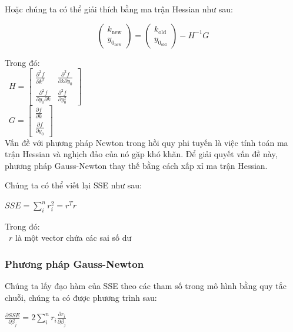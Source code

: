 \documentclass[conference]{IEEEtran}
\begin{document}
Hoặc chúng ta có thể giải thích bằng ma trận Hessian như sau:

\begin{center}
    \[
        \begin{pmatrix}
            k_{\text{new}} \\ y_{0_\text{new}}
        \end{pmatrix} =
        \begin{pmatrix}
            k_{\text{old}} \\ y_{0_\text{old}}
        \end{pmatrix} - H^{-1}G
    \]
\end{center}

Trong đó: \\
\indent\textbullet\ \(H = \begin{bmatrix}
    \frac{\partial^2 f}{\partial k^2}            & \frac{\partial^2 f}{\partial k \partial y_0} \\
    \frac{\partial^2 f}{\partial y_0 \partial k} & \frac{\partial^2 f}{\partial y_0^2}
\end{bmatrix}\)\\
\indent\textbullet\ \(G = \begin{bmatrix}
    \frac{\partial f}{\partial k} \\ \frac{\partial f}{\partial y_0}
\end{bmatrix}\)\\

Vấn đề với phương pháp Newton trong hồi quy phi tuyến là việc tính toán ma trận Hessian và nghịch đảo của nó gặp khó khăn. Để giải quyết vấn đề này, phương pháp Gauss-Newton thay thế bằng cách xấp xỉ ma trận Hessian.

Chúng ta có thể viết lại SSE như sau:
\begin{center}
    $SSE = \sum_{i}^{n}r_i^2 = r^T r$
\end{center}

Trong đó: \\
\indent\textbullet\ \(r\) là một vector chứa các sai số dư \\

\subsubsection{Phương pháp Gauss-Newton}
Chúng ta lấy đạo hàm của SSE theo các tham số trong mô hình bằng quy tắc chuỗi, chúng ta có được phương trình sau:
\begin{center}
    \(
    \frac{\partial SSE}{\partial \beta_j} = 2\sum_{i}^{n} r_i \frac{\partial r_i}{\partial \beta_j}
    \)
\end{center}
\end{document}
